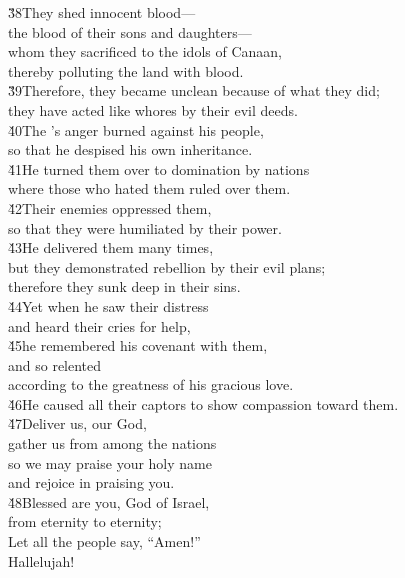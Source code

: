 \begin{poetry}
\poeml \v{38}They shed innocent blood--- \\
\poemll    the blood of their sons and daughters--- \\
\poeml whom they sacrificed to the idols of Canaan, \\
\poemll    thereby polluting the land with blood. \\
\poeml \v{39}Therefore, they became unclean because of what they did; \\
\poemll    they have acted like whores by their evil deeds. \\
\poeml \v{40}The 's anger burned against his people, \\
\poemll    so that he despised his own inheritance. \\
\poeml \v{41}He turned them over to domination by nations \\
\poemll    where those who hated them ruled over them. \\
\poeml \v{42}Their enemies oppressed them, \\
\poemll    so that they were humiliated by their power. \\
\poeml \v{43}He delivered them many times, \\
\poemll    but they demonstrated rebellion by their evil plans; \\
\poemlll       therefore they sunk deep in their sins. \\
\poeml \v{44}Yet when he saw their distress \\
\poemll    and heard their cries for help, \\
\poeml \v{45}he remembered his covenant with them, \\
\poemll    and so relented \\
\poemlll       according to the greatness of his gracious love. \\
\poeml \v{46}He caused all their captors to show compassion toward them. \\
\poeml \v{47}Deliver us,  our God, \\
\poemll    gather us from among the nations \\
\poeml so we may praise your holy name \\
\poemll    and rejoice in praising you. \\
\poeml \v{48}Blessed are you,  God of Israel, \\
\poemll    from eternity to eternity; \\
\poeml Let all the people say, ``Amen!'' \\
\poemll    Hallelujah!
\end{poetry}


